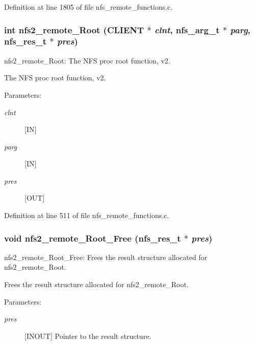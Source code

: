 Definition at line 1805 of file nfs\_\-remote\_\-functions.c.
\subsubsection[{nfs2\_\-remote\_\-Root}]{\setlength{\rightskip}{0pt plus 5cm}int nfs2\_\-remote\_\-Root (CLIENT $\ast$ {\em clnt}, \/  nfs\_\-arg\_\-t $\ast$ {\em parg}, \/  nfs\_\-res\_\-t $\ast$ {\em pres})}\label{group__NFSprocs_gc8e8c1f54e860453c2cb2102a5e6268b}


nfs2\_\-remote\_\-Root: The NFS proc root function, v2.

The NFS proc root function, v2.

\begin{Desc}
\item[Parameters:]
\begin{description}
\item[{\em clnt}][IN] \item[{\em parg}][IN] \item[{\em pres}][OUT] \end{description}
\end{Desc}


Definition at line 511 of file nfs\_\-remote\_\-functions.c.
\subsubsection[{nfs2\_\-remote\_\-Root\_\-Free}]{\setlength{\rightskip}{0pt plus 5cm}void nfs2\_\-remote\_\-Root\_\-Free (nfs\_\-res\_\-t $\ast$ {\em pres})}\label{group__NFSprocs_gcc96856bb6de86d5c05e9c5e941248f3}


nfs2\_\-remote\_\-Root\_\-Free: Frees the result structure allocated for nfs2\_\-remote\_\-Root.

Frees the result structure allocated for nfs2\_\-remote\_\-Root.

\begin{Desc}
\item[Parameters:]
\begin{description}
\item[{\em pres}][INOUT] Pointer to the result structure. \end{description}
\end{Desc}


